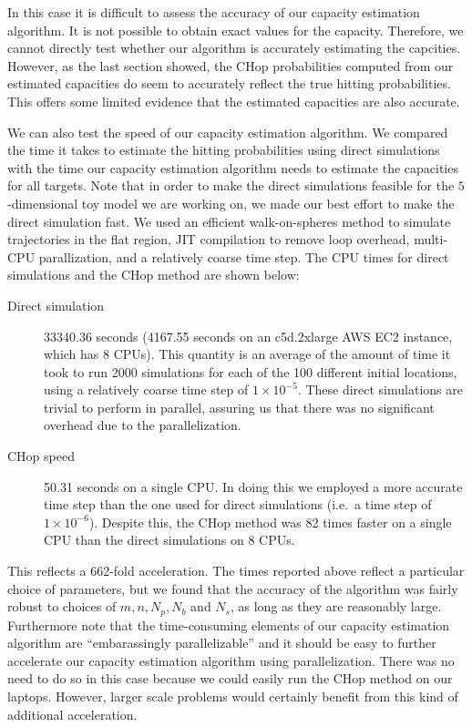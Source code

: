 \documentclass[english, aip, jcp, priprint, graphicx,floatfix]{revtex4-1}
\theoremstyle{plain}
\theoremstyle{definition}
\theoremstyle{plain}
\begin{document}
In this case it is difficult to assess the accuracy of our capacity estimation algorithm.  It is not possible to obtain exact values for the capacity.  Therefore, we cannot directly test whether our algorithm is accurately estimating the capcities.  However, as the last section showed, the CHop probabilities computed from our estimated capacities do seem to accurately reflect the true hitting probabilities.  This offers some limited evidence that the estimated capacities are also accurate.

We can also test the speed of our capacity estimation algorithm.  We compared the time it takes to estimate the hitting probabilities using direct simulations with the time our capacity estimation algorithm needs to estimate the capacities for all targets. Note that in order to make the direct simulations feasible for the $5$-dimensional toy model we are working on, we made our best effort to make the direct simulation fast.  We used an efficient walk-on-spheres method to simulate trajectories in the flat region,\cite{bingham1972random} JIT compilation to remove loop overhead, multi-CPU parallization, and a relatively coarse time step.  The CPU times for direct simulations and the CHop method are shown below:

\begin{description}
\item[Direct simulation] 33340.36 seconds (4167.55 seconds on an c5d.2xlarge AWS EC2 instance, which has 8 CPUs).  This quantity is an average of the amount of time it took to run 2000 simulations for each of the 100 different initial locations, using a relatively coarse time step of $1 \times 10^{-5}$.  These direct simulations are trivial to perform in parallel, assuring us that there was no significant overhead due to the parallelization.

\item[CHop speed] 50.31 seconds on a single CPU. In doing this we employed a more accurate time step than the one used for direct simulations (i.e.\ a time step of $1 \times 10^{-6}$). Despite this, the CHop method was 82 times faster on a single CPU than the direct simulations on 8 CPUs.

\end{description}

This reflects a 662-fold acceleration. The times reported above reflect a particular choice of parameters, but we found that the accuracy of the algorithm was fairly robust to choices of $m, n, N_p, N_b$ and $N_s$, as long as they are reasonably large. Furthermore note that the time-consuming elements of our capacity estimation algorithm are ``embarassingly parallelizable'' and it should be easy to further accelerate our capacity estimation algorithm using parallelization.  There was no need to do so in this case because we could easily run the CHop method on our laptops.  However, larger scale problems would certainly benefit from this kind of additional acceleration.
\end{document}
